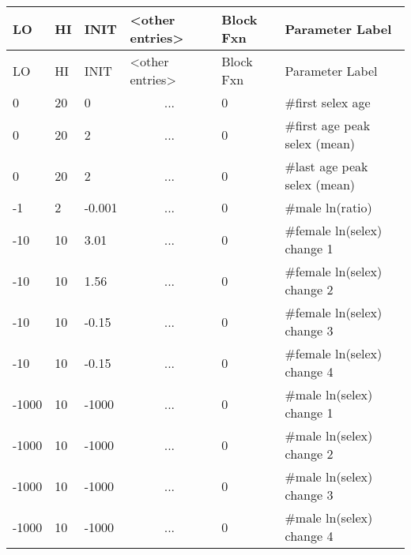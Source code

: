 	\begin{longtable}{p{1cm} p{1cm} p{1cm} p{2.9cm}  p{1.8cm}  p{5.1cm}}
		\hline
		LO \Tstrut & HI & INIT  &  <other entries> & Block Fxn & Parameter Label\Bstrut\\
		\hline
		\endfirsthead
	
		\hline
		LO \Tstrut & HI & INIT & <other entries> & Block Fxn & Parameter Label\Bstrut\\
		\hline
		\endhead

		0     & 20 &  0     & \multicolumn{1}{c}{...} & 0 & \#first selex age \Tstrut\\
		0     & 20 &  2     & \multicolumn{1}{c}{...} & 0 & \#first age peak selex (mean) \\
		0     & 20 &  2     & \multicolumn{1}{c}{...} & 0 & \#last age peak selex (mean) \\
		-1    & 2  & -0.001 & \multicolumn{1}{c}{...} & 0 & \#male ln(ratio) \\
		-10   & 10 &  3.01  & \multicolumn{1}{c}{...} & 0 & \#female ln(selex) change 1\\
		-10   & 10 &  1.56  & \multicolumn{1}{c}{...} & 0 & \#female ln(selex) change 2\\
		-10   & 10 & -0.15  & \multicolumn{1}{c}{...} & 0 & \#female ln(selex) change 3\\
		-10   & 10 & -0.15  & \multicolumn{1}{c}{...} & 0 & \#female ln(selex) change 4\\
		-1000 & 10 & -1000  & \multicolumn{1}{c}{...} & 0 & \#male ln(selex) change 1\\
		-1000 & 10 & -1000  & \multicolumn{1}{c}{...} & 0 & \#male ln(selex) change 2\\
		-1000 & 10 & -1000  & \multicolumn{1}{c}{...} & 0 & \#male ln(selex) change 3\\
		-1000 & 10 & -1000  & \multicolumn{1}{c}{...} & 0 & \#male ln(selex) change 4\Bstrut\\
		\hline
	\end{longtable}
		

